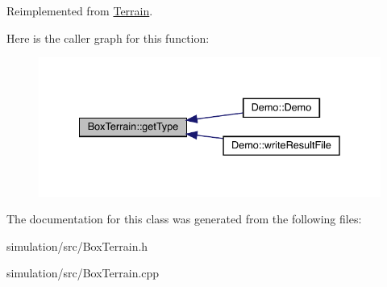 Reimplemented from \mbox{\hyperlink{class_terrain_a6cd1220b8e64466cc7a2219efff4141b}{Terrain}}.

Here is the caller graph for this function\+:\nopagebreak
\begin{figure}[H]
\begin{center}
\leavevmode
\includegraphics[width=335pt]{class_box_terrain_a8056b743b0cc1fbd38e742f542dfa34b_icgraph}
\end{center}
\end{figure}


The documentation for this class was generated from the following files\+:\begin{DoxyCompactItemize}
\item 
simulation/src/Box\+Terrain.\+h\item 
simulation/src/Box\+Terrain.\+cpp\end{DoxyCompactItemize}
